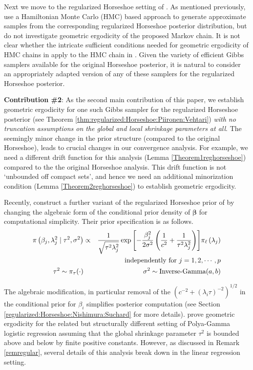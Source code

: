 \documentclass[noinfoline,11pt]{imsart}
\numberwithin{equation}{section}
\theoremstyle{plain}
\newcommand{\bb}{\boldsymbol{\beta}}
\newcommand\Myciteauthor[1]{\citeauthor{#1} \cite{#1}}
\begin{document}
Next we move to the regularized Horseshoe setting of \Myciteauthor{piironen2017}. As mentioned previously, \cite{piironen2017} use a Hamiltonian Monte Carlo (HMC) based approach to generate approximate samples from the corresponding regularized Horseshoe posterior distribution, but do not investigate geometric ergodicity of the proposed Markov chain. It is not clear whether the intricate sufficient conditions needed for geometric ergodicity of HMC chains in \Myciteauthor{livingstone2019}  apply to the HMC chain in \cite{piironen2017}. Given the variety of efficient Gibbs samplers available for the original Horseshoe posterior, it is natural to consider an appropriately adapted version of any of these samplers for the regularized Horseshoe posterior. 

{\bf Contribution \#2}: As the second main contribution of this paper, we establish geometric ergodicity for one such Gibbs sampler for the regularized Horseshoe posterior (see Theorem \ref{thm:regularized:Horseshoe:Piironen:Vehtari}) {\it with no truncation assumptions on the global and local shrinkage parameters at all}. The seemingly minor change in the prior structure (compared to the original Horseshoe), leads to crucial changes in our convergence analysis. For example, we need a different drift function for this analysis (Lemma \ref{Theorem1reghorseshoe}) compared to the the original Horseshoe analysis. This drift function is not `unbounded off compact sets', and hence we need 
an additional minorization condition (Lemma \ref{Theorem2reghorseshoe}) to establish 
geometric ergodicity. 

Recently, \Myciteauthor{nishimura2019shrinkage} construct a further variant of the regularized Horseshoe prior of \cite{piironen2017} by changing the algebraic form of the conditional prior density of $\bb$ for computational simplicity. Their prior specification is as follows. 
\begin{eqnarray*}
\pi\left(\beta_j,\lambda_j^2\mid \tau^2,\sigma^2\right) &\propto&  \frac{1}{\sqrt{\tau^2\lambda_j^2}}\exp{\left[-\frac{\beta_j^2}{2\sigma^2}\left(\frac{1}{c^2}+\frac{1}{\tau^2\lambda_j^2}\right)\right]}\pi_\ell\left(\lambda_j\right)\\
& & \text{independently for}\ j=1,2,\cdots,p\\
\tau^2\sim \pi_\tau (\cdot) & & \hspace{0.2in} \sigma^2\sim \text{Inverse-Gamma}(a,b)
\end{eqnarray*}

\noindent
The algebraic modification, in particular removal of the $(c^{-2} + (\lambda_i \tau)^{-2})^{1/2}$ in the conditional prior for $\beta_i$ simplifies posterior 
computation (see Section \ref{regularized:Horseshoe:Nishimura:Suchard} for more details). \Myciteauthor{nishimura2019shrinkage} prove geometric ergodicity for the related  but structurally different setting of Polya-Gamma logistic regression assuming that the global shrinkage parameter $\tau^2$ is bounded above and below by finite positive constants. However, as discussed in Remark \ref{remregular}, several details of this analysis break down in the linear regression setting. 
\end{document}
